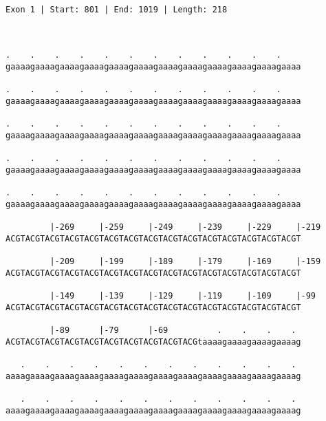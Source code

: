 \documentclass{article}
\begin{document}
 \begin{Verbatim}
 
Exon 1 | Start: 801 | End: 1019 | Length: 218



.    .    .    .    .    .    .    .    .    .    .    .    
gaaaagaaaagaaaagaaaagaaaagaaaagaaaagaaaagaaaagaaaagaaaagaaaa
                                                            
.    .    .    .    .    .    .    .    .    .    .    .    
gaaaagaaaagaaaagaaaagaaaagaaaagaaaagaaaagaaaagaaaagaaaagaaaa
                                                            
.    .    .    .    .    .    .    .    .    .    .    .    
gaaaagaaaagaaaagaaaagaaaagaaaagaaaagaaaagaaaagaaaagaaaagaaaa
                                                            
.    .    .    .    .    .    .    .    .    .    .    .    
gaaaagaaaagaaaagaaaagaaaagaaaagaaaagaaaagaaaagaaaagaaaagaaaa
                                                            
.    .    .    .    .    .    .    .    .    .    .    .    
gaaaagaaaagaaaagaaaagaaaagaaaagaaaagaaaagaaaagaaaagaaaagaaaa
                                                            
         |-269     |-259     |-249     |-239     |-229     |-219
ACGTACGTACGTACGTACGTACGTACGTACGTACGTACGTACGTACGTACGTACGTACGT
                                                            
         |-209     |-199     |-189     |-179     |-169     |-159
ACGTACGTACGTACGTACGTACGTACGTACGTACGTACGTACGTACGTACGTACGTACGT
                                                            
         |-149     |-139     |-129     |-119     |-109     |-99
ACGTACGTACGTACGTACGTACGTACGTACGTACGTACGTACGTACGTACGTACGTACGT
                                                            
         |-89      |-79      |-69          .    .    .    . 
ACGTACGTACGTACGTACGTACGTACGTACGTACGTACGtaaaagaaaagaaaagaaaag
                                                            
   .    .    .    .    .    .    .    .    .    .    .    . 
aaaagaaaagaaaagaaaagaaaagaaaagaaaagaaaagaaaagaaaagaaaagaaaag
                                                            
   .    .    .    .    .    .    .    .    .    .    .    . 
aaaagaaaagaaaagaaaagaaaagaaaagaaaagaaaagaaaagaaaagaaaagaaaag
                                                            

\end{Verbatim}
\end{document}
